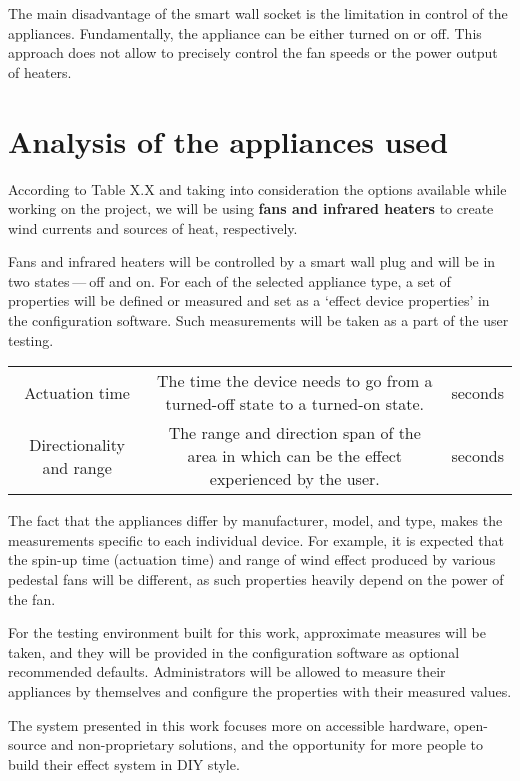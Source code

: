 The main disadvantage of the smart wall socket is the limitation in
control of the appliances. Fundamentally, the appliance can be either turned on or off.
This approach does not allow to precisely control the fan speeds or the power output
of heaters.

\hypertarget{x-analysis-of-the-appliances-used}{\section{Analysis of the appliances used}}
According to Table X.X and taking into consideration the
options available while working on the project, we will be using \textbf{fans
and infrared heaters}
to create wind currents and sources of heat, respectively.

Fans and infrared heaters will be controlled by a smart wall plug
and will be in two states — off and on. For each of the selected appliance
type, a set of properties will be defined
or measured and set as a `effect device properties' in the configuration
software. Such measurements will be taken as a part of the user testing.

\begin{center}
\begin{tabular}{|c|c|c|}
\hline
Actuation time & The time the device needs to go from a turned-off state to
  a turned-on state. & seconds \\ 
Directionality and range & The range and direction span of the area in
  which can be the effect experienced by the user. & seconds \\ 
\hline
\end{tabular}
\end{center}

The fact that the appliances differ by manufacturer, model, and type,
makes the measurements specific to each individual device.
For example, it is expected that the spin-up time
(actuation time) and range of wind effect produced by various pedestal fans
will be different, as such properties heavily depend on the power of the fan.


For the testing environment built for this work, approximate measures will be
taken, and they will be provided in the configuration software as optional
recommended defaults. Administrators will be allowed
to measure their appliances by themselves and configure the properties with
their measured values.


The system presented in this work focuses more
on accessible hardware, open-source and non-proprietary solutions, and
the opportunity for more people to build their effect system in DIY style.


